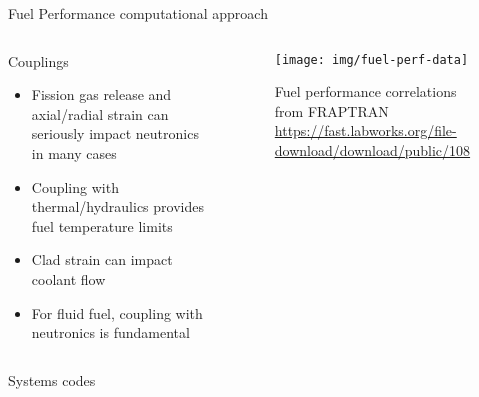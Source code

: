 \documentclass[pdf,aspectratio=169]{beamer}
\begin{document}
\begin{frame}{Fuel Performance computational approach}

    \begin{columns}
    \begin{column}{0.5\textwidth}
        Couplings
        \begin{itemize}
            \item Fission gas release and axial/radial strain can seriously impact
                neutronics in many cases
            \item Coupling with thermal/hydraulics provides fuel temperature limits
            \item Clad strain can impact coolant flow
            \item For fluid fuel, coupling with neutronics is fundamental
        \end{itemize}
    \end{column}
    \begin{column}{0.5\textwidth}
        \begin{figure}[ht]
        \centering
            \texttt{[image: img/fuel-perf-data]}
            \caption{\tiny Fuel performance correlations from FRAPTRAN
            \url{https://fast.labworks.org/file-download/download/public/108} }
        \end{figure}
    \end{column}
\end{columns}
\end{frame}



\begin{frame}[plain,c]
	\begin{center}
	\Huge Systems codes
	\end{center}
\end{frame}
\end{document}
